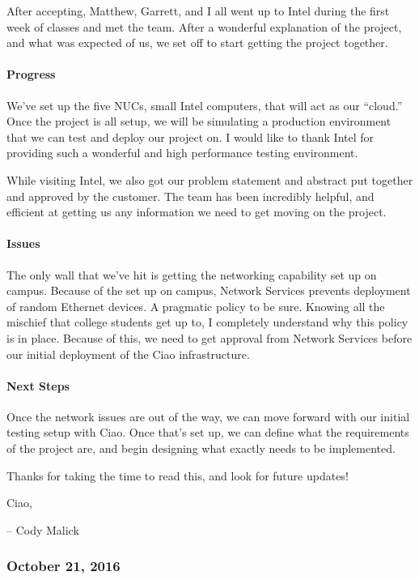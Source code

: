 \documentclass[10pt,onecolumn,journal,draftclsnofoot]{IEEEtran}
\begin{document}
After accepting, Matthew, Garrett, and I all went up to Intel during the
first week of classes and met the team. After a wonderful explanation of
the project, and what was expected of us, we set off to start getting
the project together.

\paragraph{Progress} 

We've set up the five NUCs, small Intel computers, that will act as our
``cloud.'' Once the project is all setup, we will be simulating a
production environment that we can test and deploy our project on. I
would like to thank Intel for providing such a wonderful and high
performance testing environment.

While visiting Intel, we also got our problem statement and abstract put
together and approved by the customer. The team has been incredibly
helpful, and efficient at getting us any information we need to get
moving on the project.

\paragraph{Issues} 

The only wall that we've hit is getting the networking capability set up
on campus. Because of the set up on campus, Network Services prevents
deployment of random Ethernet devices. A pragmatic policy to be sure.
Knowing all the mischief that college students get up to, I completely
understand why this policy is in place. Because of this, we need to get
approval from Network Services before our initial deployment of the Ciao
infrastructure.

\paragraph{Next Steps} 

Once the network issues are out of the way, we can move forward with our
initial testing setup with Ciao. Once that's set up, we can define what
the requirements of the project are, and begin designing what exactly
needs to be implemented.

Thanks for taking the time to read this, and look for future updates!

Ciao,

-- Cody Malick

\subsubsection{October 21, 2016} 
\end{document}
